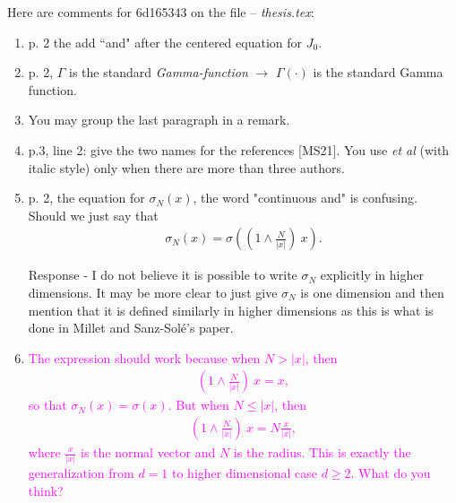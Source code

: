 \documentclass[a4paper,10pt]{article}
\begin{document}
Here are comments for 6d165343 on the file -- {\it thesis.tex}:

\begin{enumerate}
  \item p. 2 the add ``and" after the centered equation for $J_0$.
  \item p. 2, $\Gamma$ is the standard {\it Gamma-function} $\to$ $\Gamma(\cdot)$ is the standard Gamma function.
  \item You may group the last paragraph in a remark.
  \item p.3, line 2: give the two names for the references [MS21]. You use {\it et al} (with italic style) only when
    there are more than three authors.
  \item p. 2, the equation for $\sigma_N(x)$, the word "continuous and" is confusing. Should we just say that
    \begin{align*}
      \sigma_N(x) = \sigma\left(\left( 1 \wedge \frac{N}{|x|}\right )\: x \right).
    \end{align*}

    Response - I do not believe it is possible to write $\sigma_N$ explicitly in higher dimensions. It may be more clear
    to just give $\sigma_N$ is one dimension and then mention that it is defined similarly in higher dimensions as this
    is what is done in Millet and Sanz-Sol\'e's paper.

  \item[\textcolor{magenta}{Le:}] \textcolor{magenta}{The expression should work because when $N>|x|$, then
    \begin{align*}
      \left( 1 \wedge \frac{N}{|x|}\right )\: x = x,
    \end{align*}
    so that $\sigma_N(x)=\sigma(x)$. But when $N\le |x|$, then
    \begin{align*}
      \left( 1 \wedge \frac{N}{|x|}\right )\: x = N \frac{x}{|x|},
    \end{align*}
    where $\frac{x}{|x|}$ is the normal vector and $N$ is the radius. This is exactly the generalization from $d=1$ to
  higher dimensional case  $d\ge 2$. What do you think?}


\end{enumerate}
\end{document}
